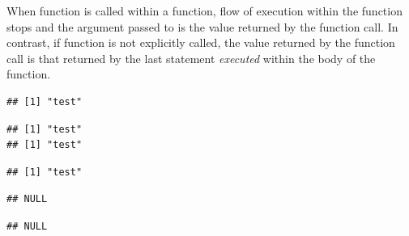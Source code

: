 \documentclass[krantz2]{krantz}\usepackage{knitr}
\begin{document}
\begin{playground}
When function  is called within a function, flow of execution within the function stops and the argument passed
to  is the value returned by the function call. In contrast, if function  is not explicitly
called, the value returned by the function call is that returned by the last statement \emph{executed} within the body of the function.

\label{chunck:print:funs}
\begin{knitrout}\footnotesize
{}\color{fgcolor}\begin{kframe}
\begin{alltt}
 \hlkwb{<-} \hlstd{(}\hlstd{)\{}
\hlstd{(}\hlstd{)}
\end{alltt}
\begin{verbatim}
## [1] "test"
\end{verbatim}
\begin{alltt}
 \hlkwb{<-} \hlstd{(}\hlstd{)\{} 
\hlstd{(}\hlstd{)}
\end{alltt}
\begin{verbatim}
## [1] "test"
## [1] "test"
\end{verbatim}
\begin{alltt}
 \hlkwb{<-} \hlstd{(}\hlstd{)\{} 
\hlstd{(}\hlstd{)}
\end{alltt}
\begin{verbatim}
## [1] "test"
\end{verbatim}
\begin{alltt}
 \hlkwb{<-} \hlstd{(}\hlstd{)\{}\hlstd{();} 
\hlstd{(}\hlstd{)}
\end{alltt}
\begin{verbatim}
## NULL
\end{verbatim}
\begin{alltt}
 \hlkwb{<-} \hlstd{(}
\hlstd{(}\hlstd{)}
\end{alltt}
\begin{verbatim}
## NULL
\end{verbatim}
\end{kframe}
\end{knitrout}
\end{playground}
\end{document}
